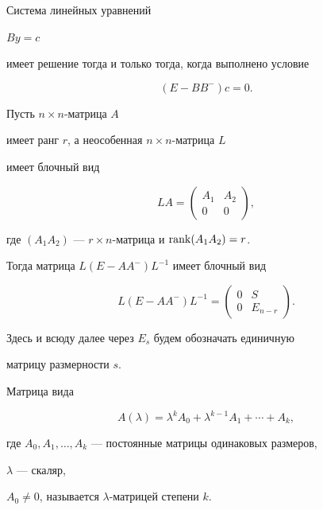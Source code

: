  


\begin{lem} Система линейных уравнений 


$By=c$ 


имеет решение тогда и только тогда, когда выполнено условие 


$$ 


(E-BB^-)c=0. 


$$ 


\end{lem} 


 


\begin{lem} Пусть $n\times n$-матрица $A$ 


имеет ранг $r$, а неособенная $n\times n$-матрица $L$ 


имеет блочный вид 


$$ 


LA=\begin{pmatrix}A_1 & A_2 \\ 0 & 0 \end{pmatrix}, 


$$ 


где $(A_1A_2)$ --- $r\times n$-матрица и $\operatorname{rank}(A_1A_2)=r$. 


Тогда матрица $L(E-AA^-)L^{-1}$ имеет блочный вид 


$$ 


L(E-AA^-)L^{-1}= 


\begin{pmatrix} 0 & S \\ 0 & E_{n-r}\end{pmatrix}. 


$$ 


Здесь и всюду далее через $E_s$ будем обозначать единичную 


матрицу размерности $s$. 


\end{lem} 


 


\begin{defn} Матрица вида 


$$ 


A(\lambda)=\lambda^k A_0+\lambda^{k-1}A_1+ 


\dotsb+ A_k, 


$$ 


где $A_0,A_1,\dotsc,A_k$ --- постоянные матрицы одинаковых размеров, 


$\lambda$ --- скаляр, 


$A_0\ne 0$, называется $\lambda$-матрицей степени $k$. 


\end{defn} 


